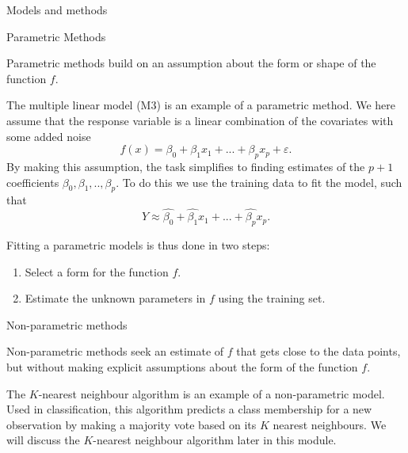 \documentclass[ignorenonframetext,]{beamer}
\providecommand{\tightlist}{%
  \setlength{\itemsep}{0pt}\setlength{\parskip}{0pt}}
\begin{document}
\begin{frame}{Models and methods}

\begin{block}{Parametric Methods}

Parametric methods build on an assumption about the form or shape of the
function \(f\).

The multiple linear model (M3) is an example of a parametric method. We
here assume that the response variable is a linear combination of the
covariates with some added noise
\[f(x) = \beta_0 + \beta_1 x_1 + ... + \beta_p x_p+\varepsilon.\] By
making this assumption, the task simplifies to finding estimates of the
\(p+1\) coefficients \(\beta_0, \beta_1, .. ,\beta_p\). To do this we
use the training data to fit the model, such that
\[Y \approx \hat{\beta_0} + \hat{\beta_1} x_1 + ... + \hat{\beta_p} x_p.\]

\end{block}

\end{frame}

\begin{frame}

Fitting a parametric models is thus done in two steps:

\begin{enumerate}
\def\labelenumi{\arabic{enumi}.}
\tightlist
\item
  Select a form for the function \(f\).\\
\item
  Estimate the unknown parameters in \(f\) using the training set.
\end{enumerate}

\end{frame}

\begin{frame}

\begin{block}{Non-parametric methods}

Non-parametric methods seek an estimate of \(f\) that gets close to the
data points, but without making explicit assumptions about the form of
the function \(f\).

The \(K\)-nearest neighbour algorithm is an example of a non-parametric
model. Used in classification, this algorithm predicts a class
membership for a new observation by making a majority vote based on its
\(K\) nearest neighbours. We will discuss the \(K\)-nearest neighbour
algorithm later in this module.

\end{block}

\end{frame}
\end{document}
